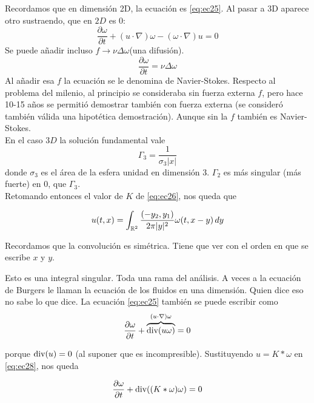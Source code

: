 
Recordamos que en dimensión 2D, la ecuación es \eqref{eq:ec25}. Al pasar a 3D aparece otro sustraendo, que en $2D$ es 0:
$$\dfrac{\partial \omega}{\partial t} + (u \cdot \nabla) \omega - (\omega \cdot \nabla)u = 0$$
Se puede añadir incluso $f \rightarrow \nu \Delta \omega$(una difusión).
$$\dfrac{\partial \omega}{\partial t} = \nu \Delta \omega$$
Al añadir esa $f$ la ecuación se le denomina de Navier-Stokes. Respecto al problema del milenio, al principio se consideraba sin fuerza externa $f$,
pero hace 10-15 años se permitió demostrar también con fuerza externa (se consideró también válida una hipotética demostración). Aunque sin la $f$ 
también es Navier-Stokes. \\

En el caso $3D$ la solución fundamental vale 
$$\Gamma_3 = \dfrac{1}{\sigma_3 |x|}$$
donde $\sigma_3$ es el área de la esfera unidad en dimensión 3. 
$\Gamma_2$ es más singular (más fuerte) en $0$, que $\Gamma_3$. \\

Retomando entonces el valor de $K$ de \eqref{eq:ec26}, nos queda que 

\begin{equation}\label{eq:ec27}
    u(t,x) = \int_{\mathbb{R}^2} \dfrac{(-y_2, y_1)}{2 \pi |y|^2} \omega(t,x-y)\,dy
\end{equation}

\begin{observacion}
    Recordamos que la convolución es simétrica. Tiene que ver con el orden en que se escribe $x$ y $y$.
\end{observacion}

Esto es una integral singular. Toda una rama del análisis. A veces a la ecuación de Burgers le llaman la ecuación de los fluidos en una dimensión.
Quien dice eso no sabe lo que dice. La ecuación \eqref{eq:ec25} también se puede escribir como
\begin{equation}\label{eq:ec28}
    \dfrac{\partial \omega}{\partial t} + \overbrace{\text{div}(u \omega)}^{(u \cdot \nabla) \omega} = 0
\end{equation}

porque $\text{div}(u) = 0$ (al suponer que es incompresible). Sustituyendo $u = K \ast \omega$ en \eqref{eq:ec28}, nos queda 

\begin{equation}\label{eq:ec29}
    \dfrac{\partial \omega}{\partial t} + \text{div}((K \ast \omega) \omega) = 0
\end{equation}

